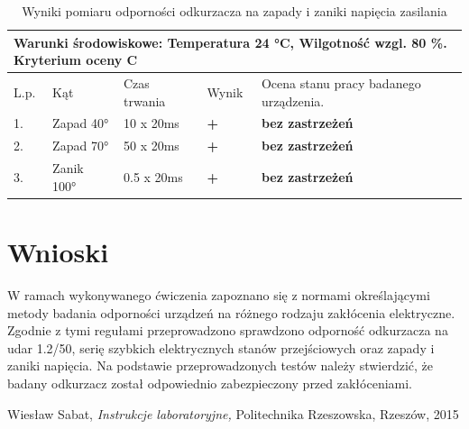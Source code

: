 \documentclass{classrep}
\begin{document}
\begin{table}[H]
	\centering
	\caption{Wyniki pomiaru odporności odkurzacza na zapady i zaniki napięcia zasilania}
	\label{tab:3}
	\begin{tabular}{|l|l|l|l|l|}
		\hline
		\multicolumn{5}{|l|}{\textbf{Warunki środowiskowe: Temperatura 24 °C, Wilgotność wzgl. 80 \%.  Kryterium oceny C}} \\ \hline
		L.p.       & Kąt              & Czas trwania       & Wynik            & Ocena stanu pracy badanego urządzenia.      \\ \hline
		1.         & Zapad  40°       & 10 x 20ms          & \textbf{+}       & \textbf{bez zastrzeżeń}                     \\ \hline
		2.         & Zapad  70°       & 50 x 20ms          & \textbf{+}       & \textbf{bez zastrzeżeń}                     \\ \hline
		3.         & Zanik  100°          & 0.5 x 20ms         & \textbf{+}       & \textbf{bez zastrzeżeń}                     \\ \hline
	\end{tabular}
\end{table}

\section{Wnioski}
W ramach wykonywanego ćwiczenia zapoznano się z normami określającymi metody badania odporności urządzeń na różnego rodzaju zakłócenia elektryczne. Zgodnie z tymi regułami przeprowadzono sprawdzono odporność odkurzacza na udar 1.2/50, serię szybkich elektrycznych stanów przejściowych oraz zapady i zaniki napięcia.
Na podstawie przeprowadzonych testów należy stwierdzić, że badany odkurzacz został odpowiednio zabezpieczony przed zakłóceniami.

\begin{thebibliography}{0}
	  Wiesław Sabat,
	\textsl{Instrukcje laboratoryjne,} Politechnika Rzeszowska, Rzeszów, 2015
\end{thebibliography}
\end{document}
